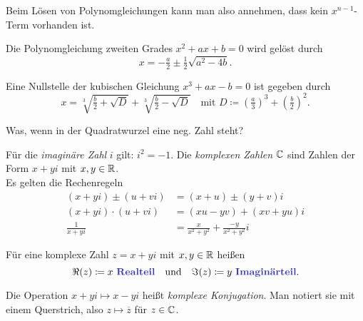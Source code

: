 \documentclass{cheat-sheet}
\begin{document}
\begin{kor}
  Beim Lösen von Polynomgleichungen kann man also annehmen, dass kein $x^{n-1}$-Term vorhanden ist.
\end{kor}

\begin{kor}[Mitternachtsformel]
  Die Polynomgleichung zweiten Grades $x^2 + ax + b = 0$ wird gelöst durch
  \[ x = - \tfrac{a}{2} \pm \tfrac{1}{2} \sqrt{a^2 - 4b}. \]
\end{kor}


\begin{satz}
  Eine Nullstelle der kubischen Gleichung $x^3 + ax - b = 0$ ist gegeben durch
  \[
    x = \sqrt[3]{\tfrac{b}{2} + \sqrt{D}} + \sqrt[3]{\tfrac{b}{2} - \sqrt{D}}
    \quad \text{mit } D \coloneqq \left(\tfrac{a}{3}\right)^3 + \left(\tfrac{b}{2}\right)^2.
  \]
\end{satz}

\begin{prob}
  Was, wenn in der Quadratwurzel eine neg. Zahl steht?
\end{prob}



\begin{defn}
  Für die \emph{imaginäre Zahl} $i$ gilt: $i^2 = -1$. Die \emph{komplexen Zahlen} $\mathbb{C}$ sind Zahlen der Form $x + y i$ mit $x, y \in \mathbb{R}$.\\
  Es gelten die Rechenregeln
  \begin{align*}
    (x + yi) \pm (u + vi) &= (x+u) \pm (y+v)i\\
    (x + yi) \cdot (u + vi) &= (xu - yv) + (xv + yu)i\\
    \frac{1}{x + yi} &= \frac{x}{x^2 + y^2} + \frac{-y}{x^2 + y^2} i
  \end{align*}
\end{defn}


\begin{defn}
  Für eine komplexe Zahl $z = x + yi$ mit $x, y \in \mathbb{R}$ heißen
  \[
    \Re(z) \coloneqq x \text{ \emph{Realteil}}
    \quad \text{und} \quad
    \Im(z) \coloneqq y \text{ \emph{Imaginärteil}}.
  \]
\end{defn}

\begin{defn}
  Die Operation $x + yi \mapsto x - yi$ heißt \emph{komplexe Konjugation}. Man notiert sie mit einem Querstrich, also $z \mapsto \overline{z}$ für $z \in \mathbb{C}$.
\end{defn}
\end{document}
